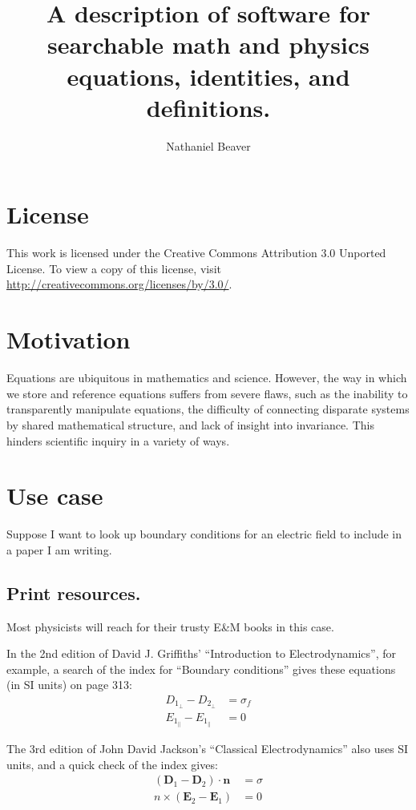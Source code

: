 \documentclass[12pt,letterpaper]{article}
\author{Nathaniel Beaver}
\title{A description of software for searchable math and physics equations, identities, and definitions.}
\begin{document}
\maketitle

\tableofcontents

\section{License}

This work is licensed under the Creative Commons Attribution 3.0 Unported License.
To view a copy of this license, visit \url{http://creativecommons.org/licenses/by/3.0/}.

\section{Motivation}

Equations are ubiquitous in mathematics and science.
However, the way in which we store and reference equations suffers from severe flaws,
such as the inability to transparently manipulate equations,
the difficulty of connecting disparate systems by shared mathematical structure,
and lack of insight into invariance.
This hinders scientific inquiry in a variety of ways.

\section{Use case}

Suppose I want to look up boundary conditions for an electric field to include in a paper I am writing.

\subsection{Print resources.}

Most physicists will reach for their trusty E\&M books in this case.

In the 2nd edition of David J. Griffiths' ``Introduction to Electrodynamics'', for example,
a search of the index for ``Boundary conditions'' gives these equations (in SI units) on page 313:
\begin{align*}
D_{1_\bot} - D_{2_\bot} &= \sigma_f \\
E_{1_\parallel} - E_{1_\parallel} &= 0
\end{align*}

The 3rd edition of John David Jackson's ``Classical Electrodynamics'' also uses SI units,
and a quick check of the index gives:
\begin{align*}
(\mathbf{D}_1 - \mathbf{D}_2)\cdot \mathbf{n} &= \sigma \\
n \times (\mathbf{E}_2 - \mathbf{E}_1) &= 0
\end{align*}
\end{document}
